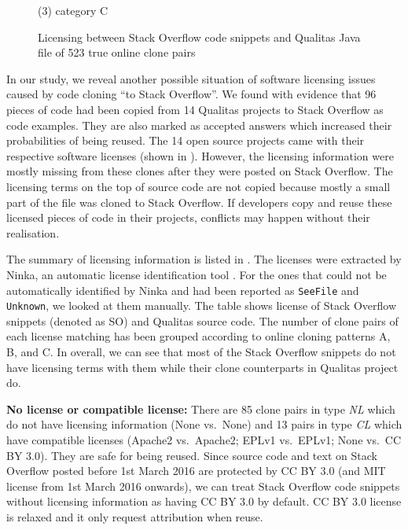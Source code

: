 \documentclass{sig-alternate-05-2015}
\begin{document}
\begin{figure}
	\caption*{(3) category C}\label{fig:heatmap_c}
	\endminipage
	\caption{Licensing between Stack Overflow code snippets and Qualitas Java file of 523 true online clone pairs}
\end{figure}

In our study, we reveal another possible situation of software licensing issues caused by code cloning ``to Stack Overflow''. We found with evidence that 96 pieces of code had been copied from 14 Qualitas projects to Stack Overflow as code examples. They are also marked as accepted answers which increased their probabilities of being reused. The 14 open source projects came with their respective software licenses (shown in ). However, the licensing information were mostly missing from these clones after they were posted on Stack Overflow. The licensing terms on the top of source code are not copied because mostly a small part of the file was cloned to Stack Overflow. If developers copy and reuse these licensed pieces of code in their projects, conflicts may happen without their realisation. 

The summary of licensing information is listed in . The licenses were extracted by Ninka, an automatic license identification tool \cite{German2010}. For the ones that could not be automatically identified by Ninka and had been reported as \texttt{SeeFile} and \texttt{Unknown}, we looked at them manually.  The table shows license of Stack Overflow snippets (denoted as SO) and Qualitas source code. The number of clone pairs of each license matching has been grouped according to online cloning patterns A, B, and C. In overall, we can see that most of the Stack Overflow snippets do not have licensing terms with them while their clone counterparts in Qualitas project do. 

\textbf{No license or compatible license:} There are 85 clone pairs in type \textit{NL} which do not have licensing information (None vs.~None) and 13 pairs in type \textit{CL} which have compatible licenses (Apache2 vs.~Apache2; EPLv1 vs.~EPLv1; None vs.~CC BY 3.0). They are safe for being reused. Since source code and text on Stack Overflow posted before 1st March 2016 are protected by CC BY 3.0 (and MIT license from 1st March 2016 onwards), we can treat Stack Overflow code snippets without licensing information as having CC BY 3.0 by default. CC BY 3.0 license is relaxed and it only request attribution when reuse. 
\end{document}
